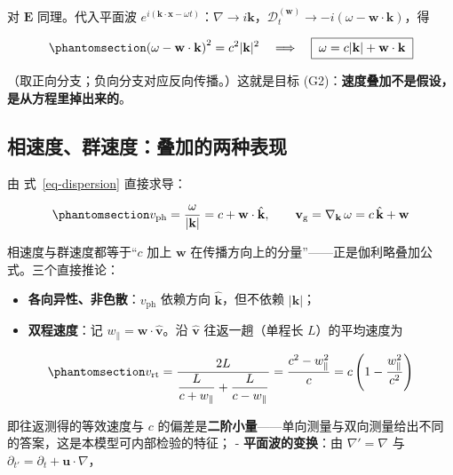 \documentclass[
  chinese,
  a4paper,
  UTF8,
  12pt,
  oneside,
  openany]{ctexbook}
\providecommand{\tightlist}{%
  \setlength{\itemsep}{0pt}\setlength{\parskip}{0pt}}
\theoremstyle{plain}
\theoremstyle{plain}
\theoremstyle{plain}
\theoremstyle{definition}
\theoremstyle{plain}
\theoremstyle{plain}
\theoremstyle{remark}
\begin{document}
对 \(\mathbf{E}\) 同理。代入平面波
\(e^{i\left(\mathbf{k}\cdot\mathbf{x}-\omega t\right)}\)：\(\nabla\to i\mathbf{k}\)，\(\mathcal{D}_t^{(\mathbf{w})}\to -i\left(\omega-\mathbf{w}\cdot\mathbf{k}\right)\)，得

\begin{equation}\protect\phantomsection\label{eq-dispersion}{
\left(\omega - \mathbf{w}\cdot\mathbf{k}\right)^{2} = c^{2}|\mathbf{k}|^{2}
\quad\Longrightarrow\quad
\boxed{\;\omega = c|\mathbf{k}| + \mathbf{w}\cdot\mathbf{k}\;}
}\end{equation}

（取正向分支；负向分支对应反向传播。）这就是目标
(G2)：\textbf{速度叠加不是假设，是从方程里掉出来的}。

\subsection{相速度、群速度：叠加的两种表现}\label{ux76f8ux901fux5ea6ux7fa4ux901fux5ea6ux53e0ux52a0ux7684ux4e24ux79cdux8868ux73b0}

由 式~\ref{eq-dispersion} 直接求导：

\begin{equation}\protect\phantomsection\label{eq-phase-group}{
v_{\mathrm{ph}} = \frac{\omega}{|\mathbf{k}|} = c + \mathbf{w}\cdot\hat{\mathbf{k}},
\qquad
\mathbf{v}_{\mathrm{g}} = \nabla_{\mathbf{k}}\,\omega = c\,\hat{\mathbf{k}} + \mathbf{w}
}\end{equation}

相速度与群速度都等于``\(c\) 加上 \(\mathbf{w}\)
在传播方向上的分量''------正是伽利略叠加公式。三个直接推论：

\begin{itemize}
\tightlist
\item
  \textbf{各向异性、非色散}：\(v_{\mathrm{ph}}\) 依赖方向
  \(\hat{\mathbf{k}}\)，但不依赖 \(|\mathbf{k}|\)；
\item
  \textbf{双程速度}：记
  \(w_{\parallel} = \mathbf{w}\cdot\hat{\mathbf{v}}\)。沿
  \(\hat{\mathbf{v}}\) 往返一趟（单程长 \(L\)）的平均速度为
\end{itemize}

\begin{equation}\protect\phantomsection\label{eq-round-trip}{
v_{\mathrm{rt}} = \frac{2L}{\dfrac{L}{c+w_{\parallel}} + \dfrac{L}{c-w_{\parallel}}}
= \frac{c^{2}-w_{\parallel}^{2}}{c}
= c\left(1-\frac{w_{\parallel}^{2}}{c^{2}}\right)
}\end{equation}

即往返测得的等效速度与 \(c\)
的偏差是\textbf{二阶小量}------单向测量与双向测量给出不同的答案，这是本模型可内部检验的特征；
- \textbf{平面波的变换}：由 \(\nabla'=\nabla\) 与
\(\partial_{t'}=\partial_t+\mathbf{u}\cdot\nabla\)，
\end{document}
